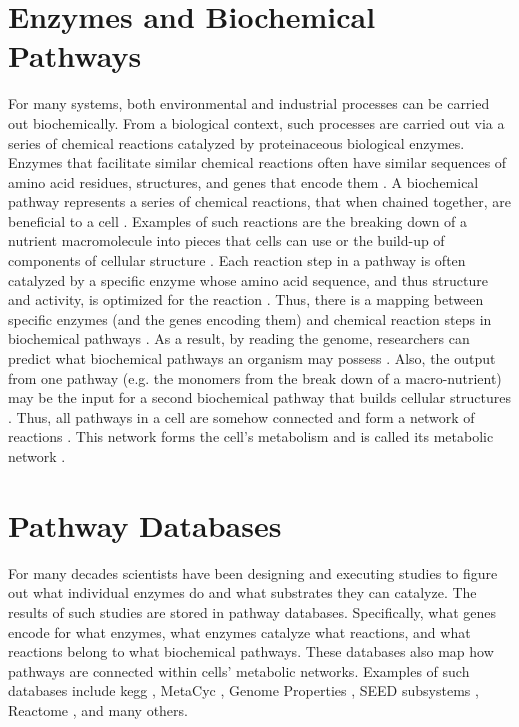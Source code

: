 \section{Enzymes and Biochemical Pathways} \label{enzymes-and-pathways} 

For many systems, both environmental and industrial processes can be carried out biochemically. From a biological context, such processes are carried out via a series of chemical reactions catalyzed by proteinaceous biological enzymes. Enzymes that facilitate similar chemical reactions often \cite{galperin1998analogous} have similar sequences of amino acid residues, structures, and genes that encode them \cite{zhang2003evolution}. A biochemical pathway represents a series of chemical reactions, that when chained together, are beneficial to a cell \cite{michal2012biochemical}. Examples of such reactions are the breaking down of a nutrient macromolecule into pieces that cells can use or the build-up of components of cellular structure \cite{wagner2012metabolic}. Each reaction step in a pathway is often \cite{keller2015widespread,tawfik2010enzyme} catalyzed by a specific enzyme whose amino acid sequence, and thus structure and activity, is optimized for the reaction \cite{michal2012biochemical,zhang2003evolution,fersht1999structure}. Thus, there is a mapping between specific enzymes (and the genes encoding them) and chemical reaction steps in biochemical pathways \cite{thiele2010protocol}. As a result, by reading the genome, researchers can predict what biochemical pathways an organism may possess \cite{abubucker2012metabolic,thiele2010protocol}. Also, the output from one pathway (e.g. the monomers from the break down of a macro-nutrient) may be the input for a second biochemical pathway that builds cellular structures \cite{wagner2012metabolic,stelling2002metabolic}. Thus, all pathways in a cell are somehow connected and form a network of reactions \cite{wagner2012metabolic,stelling2002metabolic}. This network forms the cell's metabolism and is called its metabolic network \cite{wagner2012metabolic}.

\section{Pathway Databases} \label{pathway-databases}

For many decades scientists have been designing and executing studies to figure out what individual enzymes do and what substrates they can catalyze. The results of such studies are stored in pathway databases. Specifically, what genes encode for what enzymes, what enzymes catalyze what reactions, and what reactions belong to what biochemical pathways. These databases also map how pathways are connected within cells' metabolic networks. Examples of such databases include \gls{kegg} \cite{kanehisa2000kegg}, MetaCyc \cite{karp2002metacyc}, Genome Properties \cite{richardson2018genome}, SEED subsystems \cite{overbeek2005subsystems}, Reactome \cite{croft2013reactome}, and many others.

